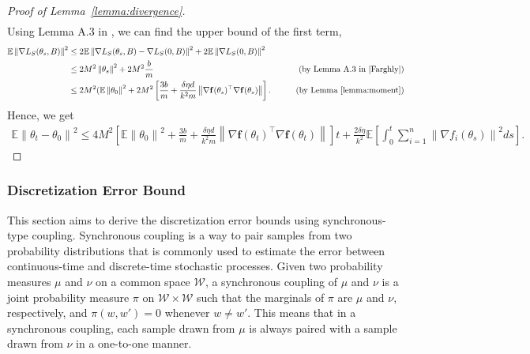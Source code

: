 \documentclass{article}
\newcommand{\norm}[1]{\left\lVert#1\right\rVert} %
\begin{document}
\begin{proof}[Proof of Lemma~\ref{lemma:divergence}]
\begin{align*}
	\end{align*}
	Using Lemma A.3 in \citet{Farghly}, we can find the upper bound of the first term,
	\begin{align*}
		\mathbb{E} \norm{\nabla L_S(\theta_s, B)}^2 &\leq 2\mathbb{E}\norm{\nabla L_S(\theta_s, B) - \nabla L_S(0, B)}^2 + 2\mathbb{E}\norm{\nabla L_S(0, B)}^2\\
		&\leq 2M^2 \norm{\theta_s}^2 + 2M^2 \frac{b}{m} & \tag{by Lemma A.3 in \cite{Farghly}}\\
		&\leq 2M^2 (\mathbb{E}\norm{\theta_0}^2 +  2M^2 \left[\frac{3b}{m} +\frac{\delta \eta d}{k^2 m}  \norm{\nabla \mathbf{f}(\theta_s)^\top \nabla \mathbf{f}(\theta_s)}\right]. & \tag{by Lemma~\ref{lemma:moment}}
	\end{align*} 	
	Hence, we get
	\begin{align*}
		\mathbb{E} \norm{\theta_t - \theta_0}^2 \leq 4M^2  \left[\mathbb{E}\norm{\theta_0}^2 +   \frac{3b}{m} +\frac{\delta \eta d}{k^2 m}  \norm{\nabla \mathbf{f}(\theta_t)^\top \nabla \mathbf{f}(\theta_t)}\right] t +\frac{2\delta \eta}{k^2} \mathbb{E}  \left[\int_{0}^t  \sum_{i=1}^n \norm{\nabla f_i (\theta_s)}^2 ds \right].
	\end{align*}
\end{proof}

\subsubsection{Discretization Error Bound}\label{appendix:discretization}
This section aims to derive the discretization error bounds using synchronous-type coupling. Synchronous coupling is a way to pair samples from two probability distributions that is commonly used to estimate the error between continuous-time and discrete-time stochastic processes. Given two probability measures $\mu$ and $\nu$ on a common space $\mathcal{W}$, a synchronous coupling of $\mu$ and $\nu$ is a joint probability measure $\pi$ on $\mathcal{W} \times \mathcal{W}$ such that the marginals of $\pi$ are $\mu$ and $\nu$, respectively, and $\pi(w,w')=0$ whenever $w \neq w'$. This means that in a synchronous coupling, each sample drawn from $\mu$ is always paired with a sample drawn from $\nu$ in a one-to-one manner.
\end{document}
